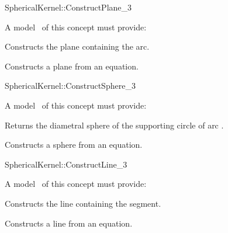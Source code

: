
\begin{ccRefFunctionObjectConcept}{SphericalKernel::ConstructPlane_3}

\ccRefines


A model \ccVar\ of this concept must provide:

{Constructs the plane containing the arc.}

{Constructs a plane from an equation.}

\ccSeeAlso


\end{ccRefFunctionObjectConcept}
\begin{ccRefFunctionObjectConcept}{SphericalKernel::ConstructSphere_3}

\ccRefines


A model \ccVar\ of this concept must provide:

{Returns the diametral sphere of the supporting circle of arc .}

{Constructs a sphere from an equation.}

\ccSeeAlso


\end{ccRefFunctionObjectConcept}
\begin{ccRefFunctionObjectConcept}{SphericalKernel::ConstructLine_3}

\ccRefines


A model \ccVar\ of this concept must provide:

{Constructs the line containing the segment.}

{Constructs a line from an equation.}

\ccSeeAlso


\end{ccRefFunctionObjectConcept}
